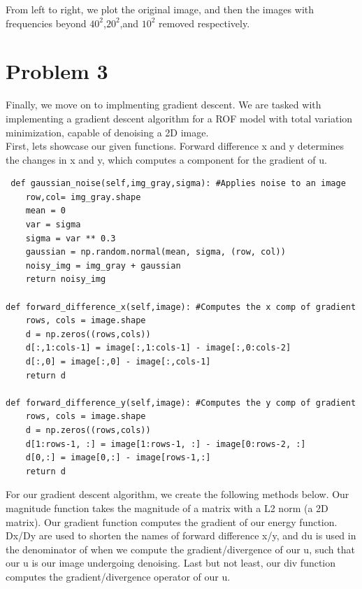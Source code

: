 \documentclass[12pt]{article}
\begin{document}
\noindent From left to right, we plot the original image, and then the images with frequencies beyond $40^2$,$20^2$,and $10^2$ removed respectively.
\pagebreak\\

\noindent\section*{Problem 3}

\noindent Finally, we move on to implmenting gradient descent. We are tasked with implementing a gradient descent algorithm for a ROF model with total variation minimization, capable of denoising a 2D image.\\

\noindent First, lets showcase our given functions. Forward difference x and y determines the changes in x and y, which computes a component for the gradient of u.\\

\begin{mdframed}[backgroundcolor=bg]
\begin{verbatim}
 def gaussian_noise(self,img_gray,sigma): #Applies noise to an image
    row,col= img_gray.shape
    mean = 0
    var = sigma
    sigma = var ** 0.3
    gaussian = np.random.normal(mean, sigma, (row, col)) 
    noisy_img = img_gray + gaussian
    return noisy_img

def forward_difference_x(self,image): #Computes the x comp of gradient
    rows, cols = image.shape
    d = np.zeros((rows,cols))
    d[:,1:cols-1] = image[:,1:cols-1] - image[:,0:cols-2]
    d[:,0] = image[:,0] - image[:,cols-1]
    return d

def forward_difference_y(self,image): #Computes the y comp of gradient
    rows, cols = image.shape
    d = np.zeros((rows,cols))
    d[1:rows-1, :] = image[1:rows-1, :] - image[0:rows-2, :]
    d[0,:] = image[0,:] - image[rows-1,:]
    return d
\end{verbatim}
\end{mdframed}

\noindent For our gradient descent algorithm, we create the following methods below. Our magnitude function takes the magnitude of a matrix with a L2 norm (a 2D matrix). Our gradient function computes the gradient of our energy function. Dx/Dy are used to shorten the names of forward difference x/y, and du is used in the denominator of when we compute the gradient/divergence of our u, such that our u is our image undergoing denoising. Last but not least, our div function computes the gradient/divergence operator of our u.
\end{document}

